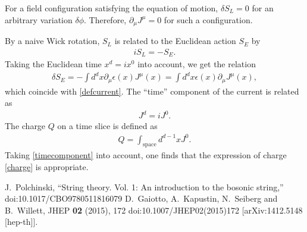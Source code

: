 \documentclass[12pt]{scrartcl}
\newcommand{\del}{\partial}
\begin{document}
For a field configuration satisfying the equation of motion, $\delta S_{L}=0$ for an arbitrary variation $\delta \phi$.  Therefore, $\del_{\mu}J^{\mu}=0$ for such a configuration.

By a naive Wick rotation, $S_{L}$ is related to the Euclidean action $S_{E}$ by
\begin{align}
    iS_{L}=-S_{E}.
\end{align}
Taking the Euclidean time $x^d=ix^0$ into account, we get the relation
\begin{align}
    \delta S_{E}=-\int d^d x \del_{\mu}\epsilon(x) J^{\mu}(x)=\int d^d x \epsilon(x) \del_{\mu}J^{\mu}(x),
\end{align}
which coincide with \eqref{defcurrent}.  The ``time'' component of the current is related as
\begin{align}
    J^{d}=iJ^{0}.\label{timecomponent}
\end{align}
The charge $Q$ on a time slice is defined as
\begin{align}
    Q=\int_{\text{space}} d^{d-1}x J^{0}.
\end{align}
Taking \eqref{timecomponent} into account, one finds that the expression of charge \eqref{charge} is appropriate.

\begin{thebibliography}{9}
J.~Polchinski,
``String theory. Vol. 1: An introduction to the bosonic string,''
doi:10.1017/CBO9780511816079
D.~Gaiotto, A.~Kapustin, N.~Seiberg and B.~Willett,
JHEP \textbf{02} (2015), 172
doi:10.1007/JHEP02(2015)172
[arXiv:1412.5148 [hep-th]].
\end{thebibliography}
\end{document}
